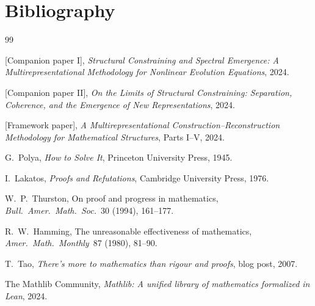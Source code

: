 \documentclass[11pt,a4paper]{article}
\theoremstyle{definition}
\theoremstyle{plain}
\begin{document}
\section{Bibliography}
\label{app:biblio}

\begin{thebibliography}{99}

[Companion paper I],
\emph{Structural Constraining and Spectral Emergence: A
Multirepresentational Methodology for Nonlinear Evolution
Equations}, 2024.

[Companion paper II],
\emph{On the Limits of Structural Constraining: Separation,
Coherence, and the Emergence of New Representations}, 2024.

[Framework paper],
\emph{A Multirepresentational Construction--Reconstruction
Methodology for Mathematical Structures}, Parts I--V, 2024.

G.~Polya,
\emph{How to Solve It}, Princeton University Press, 1945.

I.~Lakatos,
\emph{Proofs and Refutations}, Cambridge University Press, 1976.

W.~P.~Thurston,
On proof and progress in mathematics,
\emph{Bull.~Amer.~Math.~Soc.}~30 (1994), 161--177.

R.~W.~Hamming,
The unreasonable effectiveness of mathematics,
\emph{Amer.~Math.~Monthly}~87 (1980), 81--90.

T.~Tao,
\emph{There's more to mathematics than rigour and proofs},
blog post, 2007.

The Mathlib Community,
\emph{Mathlib: A unified library of mathematics formalized in Lean},
2024.

\end{thebibliography}
\end{document}

